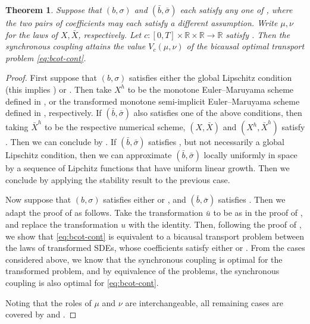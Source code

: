 \documentclass[onseside, final]{amsart}
\newtheorem{theorem}{Theorem}[section]
\theoremstyle{definition}
\newcommand{\R}{\mathbb R}
\numberwithin{equation}{section}
\begin{document}
	\begin{theorem}\label{thm:mixed-assumptions}
		Suppose that $(b, \sigma)$ and $(\bar b, \bar \sigma)$ each satisfy any one of , where the two pairs of coefficients may each satisfy a different assumption. Write $\mu, \nu$ for the laws of $X, \bar X$, respectively. 
		Let $c \colon [0, T] \times \R \times \R \to \R$ satisfy . Then the synchronous coupling attains the value $V_c(\mu, \nu)$ of the bicausal optimal transport problem \eqref{eq:bcot-cont}.
	\end{theorem}
	
	\begin{proof}
		First suppose that $(b, \sigma)$ satisfies either the global Lipschitz condition  (this implies ) or . Then take $X^h$ to be the monotone Euler--Maruyama scheme defined in \cite[Definition 3.13]{BaKaRo22}, or the transformed monotone semi-implicit Euler--Maruyama scheme defined in , respectively.		
		If $(\bar b, \bar \sigma)$ also satisfies one of the above conditions, then taking $\bar X^h$ to be the respective numerical scheme, $(X, \bar X)$ and $(X^h, \bar X^h)$ satisfy . Then we can conclude by .
		If $(\bar b, \bar \sigma)$ satisfies , but not necessarily a global Lipschitz condition, then we can approximate $(\bar b, \bar \sigma)$ locally uniformly in space by a sequence of Lipchitz functions that have uniform linear growth. Then we conclude by applying the stability result  to the previous case.
				
		Now suppose that $(b, \sigma)$ satisfies either  or , and $(\bar b, \bar \sigma)$ satisfies . Then we adapt the proof of  as follows. Take the transformation $\bar u$ to be as in the proof of , and replace the transformation $u$ with the identity. Then, following the proof of , we show that \eqref{eq:bcot-cont} is equivalent to a bicausal transport problem between the laws of transformed SDEs, whose coefficients satisfy either  or . From the cases considered above, we know that the synchronous coupling is optimal for the transformed problem, and by equivalence of the problems, the synchronous coupling is also optimal for \eqref{eq:bcot-cont}.
				
		Noting that the roles of $\mu$ and $\nu$ are interchangeable, all remaining cases are covered by  and .
	\end{proof}
\end{document}
